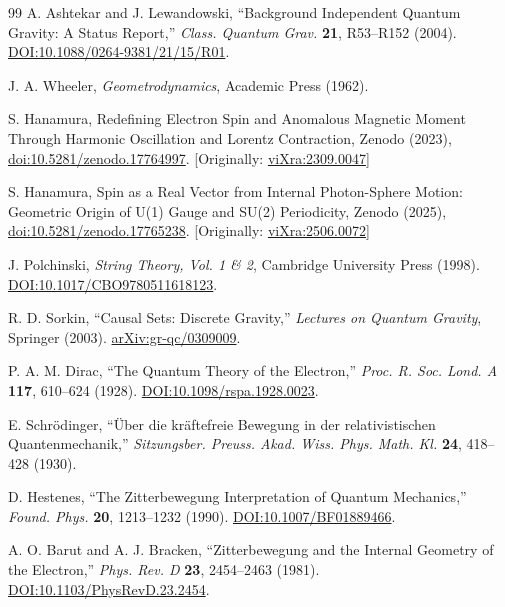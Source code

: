 \documentclass[%
 reprint,
 amsmath,amssymb,
 aps,
]{revtex4-1}
\numberwithin{equation}{section}%
\begin{document}
\begin{thebibliography}{99}
A. Ashtekar and J. Lewandowski,
``Background Independent Quantum Gravity: A Status Report,''
\textit{Class. Quantum Grav.} \textbf{21}, R53--R152 (2004).
\href{https://doi.org/10.1088/0264-9381/21/15/R01}{DOI:10.1088/0264-9381/21/15/R01}.

J. A. Wheeler,
\textit{Geometrodynamics},
Academic Press (1962).

S. Hanamura, Redefining Electron Spin and Anomalous Magnetic Moment Through Harmonic Oscillation and Lorentz Contraction, Zenodo (2023), \href{https://doi.org/10.5281/zenodo.17764997}{doi:10.5281/zenodo.17764997}. [Originally: \href{https://vixra.org/abs/2309.0047}{viXra:2309.0047}]

S. Hanamura, Spin as a Real Vector from Internal Photon-Sphere Motion: Geometric Origin of U(1) Gauge and SU(2) Periodicity, Zenodo (2025), \href{https://doi.org/10.5281/zenodo.17765238}{doi:10.5281/zenodo.17765238}. [Originally: \href{https://vixra.org/abs/2506.0072}{viXra:2506.0072}]

J. Polchinski,
\textit{String Theory, Vol. 1 \& 2},
Cambridge University Press (1998).
\href{https://doi.org/10.1017/CBO9780511618123}{DOI:10.1017/CBO9780511618123}.

R. D. Sorkin,
``Causal Sets: Discrete Gravity,''
\textit{Lectures on Quantum Gravity}, Springer (2003).
\href{https://arxiv.org/abs/gr-qc/0309009}{arXiv:gr-qc/0309009}.

P. A. M. Dirac,
``The Quantum Theory of the Electron,''
\textit{Proc. R. Soc. Lond. A} \textbf{117}, 610--624 (1928).
\href{https://doi.org/10.1098/rspa.1928.0023}{DOI:10.1098/rspa.1928.0023}.

E. Schr\"odinger,
``\"Uber die kr\"aftefreie Bewegung in der relativistischen Quantenmechanik,''
\textit{Sitzungsber. Preuss. Akad. Wiss. Phys. Math. Kl.} \textbf{24}, 418--428 (1930).

D. Hestenes,
``The Zitterbewegung Interpretation of Quantum Mechanics,''
\textit{Found. Phys.} \textbf{20}, 1213--1232 (1990).
\href{https://doi.org/10.1007/BF01889466}{DOI:10.1007/BF01889466}.

A. O. Barut and A. J. Bracken,
``Zitterbewegung and the Internal Geometry of the Electron,''
\textit{Phys. Rev. D} \textbf{23}, 2454--2463 (1981).
\href{https://doi.org/10.1103/PhysRevD.23.2454}{DOI:10.1103/PhysRevD.23.2454}.


\end{thebibliography}
\end{document}
